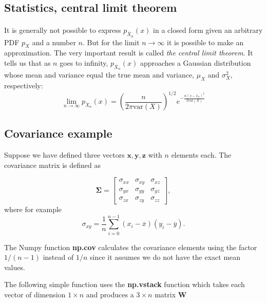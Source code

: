 \documentclass[%
oneside,                 %
final,                   %
10pt]{article}
\begin{document}
\subsection{Statistics, central limit theorem}

\paragraph{}
It is generally not possible to express $p_{\overline X_n}(x)$ in a
closed form given an arbitrary PDF $p_X^{\phantom X}$ and a number
$n$. But for the limit $n\to\infty$ it is possible to make an
approximation. The very important result is called \emph{the central limit theorem}. It tells us that as $n$ goes to infinity,
$p_{\overline X_n}(x)$ approaches a Gaussian distribution whose mean
and variance equal the true mean and variance, $\mu_{X}^{\phantom X}$
and $\sigma_{X}^{2}$, respectively:
\begin{equation}
\lim_{n\to\infty} p_{\overline X_n}(x) =
\left(\frac{n}{2\pi\mathrm{var}(X)}\right)^{1/2}
e^{-\frac{n(x-\bar x_n)^2}{2\mathrm{var}(X)}}
\label{eq:central_limit_gaussian}
\end{equation}




\subsection{Covariance example}

Suppose we have defined three vectors $\bm{x}, \bm{y}, \bm{z}$ with
$n$ elements each. The covariance matrix is defined as


\[
\bm{\Sigma} = \begin{bmatrix} \sigma_{xx} & \sigma_{xy} & \sigma_{xz} \\
                              \sigma_{yx} & \sigma_{yy} & \sigma_{yz} \\
                              \sigma_{zx} & \sigma_{zy} & \sigma_{zz}
             \end{bmatrix},
\]
where for example
\[
\sigma_{xy} =\frac{1}{n} \sum_{i=0}^{n-1}(x_i- \overline{x})(y_i- \overline{y}).
\]

The Numpy function \textbf{np.cov} calculates the covariance elements using
the factor $1/(n-1)$ instead of $1/n$ since it assumes we do not have
the exact mean values.

The following simple function uses the \textbf{np.vstack} function which
takes each vector of dimension $1\times n$ and produces a $3\times n$
matrix $\bm{W}$
\end{document}
